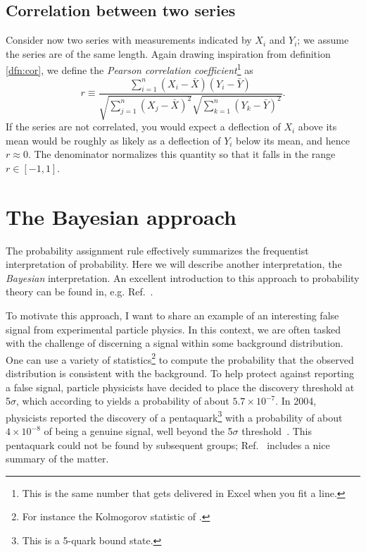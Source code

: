 \subsection{Correlation between two series}


Consider now two series with measurements indicated by $X_i$ and $Y_i$;
we assume the series are of the same length. Again drawing
inspiration from definition \eqref{dfn:cor}, we define the
{\it Pearson correlation coefficient}\footnote{This is the same number that gets 
delivered in Excel when you fit a line.}
as
\begin{equation}
r\equiv
\frac{\sum_{i=1}^n\left(X_i-\bar{X}\right)\left(Y_i-\bar{Y}\right)}{\sqrt{\sum_{j=1}^n\left(X_j-\bar{X}\right)^2}
\sqrt{\sum_{k=1}^n\left(Y_k-\bar{Y}\right)^2}}.
\end{equation}
If the series are not correlated, you would expect a deflection of $X_i$
above its mean would be roughly as likely as a deflection of $Y_i$
below its mean, and hence $r\approx0$. The denominator normalizes this
quantity so that it falls in the range $r\in[-1,1]$.

\section{The Bayesian approach}\label{sec:bayes}

The probability assignment rule  effectively summarizes 
the frequentist interpretation of probability. Here we
will describe another interpretation, the {\it Bayesian} interpretation. An excellent introduction to this approach
to probability theory can be found in, e.g. Ref.~\cite{sivia_data_2006}.

To motivate this approach, I want to share an example of an interesting false
signal from experimental particle physics. In this context, we are often tasked
with the challenge of discerning a signal within some background distribution.
One can use a variety of statistics\footnote{For instance the Kolmogorov
statistic of .} to compute the probability that the observed
distribution is consistent with the background. To help protect against
reporting a false signal, particle physicists have decided to place the
discovery threshold at 5$\sigma$, which according to 
yields a probability of about $5.7\times10^{-7}$. In 2004, physicists
reported the discovery of a pentaquark\footnote{This is a
5-quark bound state.} with a probability of about
$4\times10^{-8}$ of being a genuine signal, well beyond the
5$\sigma$ threshold~\cite{aktas_evidence_2004}. This pentaquark could
not be found by subsequent groups; Ref.~\cite{rossi_tetra-quarks_2021}
includes a nice summary of the matter.

